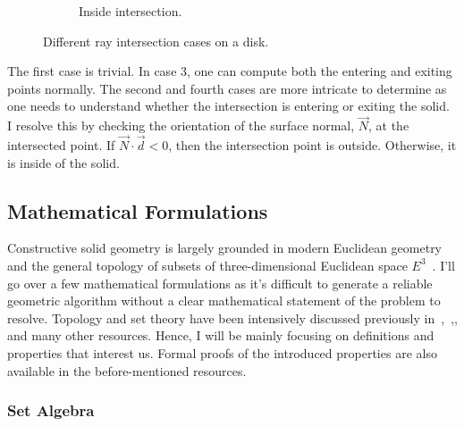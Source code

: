 \documentclass[a4paper,11pt,oneside]{article}
\begin{document}
\begin{figure}[ht]
\begin{subfigure}[b]{0.4\textwidth}
		\caption{Inside intersection.}
		\label{sec3.1:inside-intersection}
	\end{subfigure}
	\caption{Different ray intersection cases on a disk.}
	\label{sec3.1:intersection-cases}
\end{figure}


The first case is trivial. In case 3, one can compute both the entering and exiting points normally. The second and fourth cases are more intricate to determine as one needs to understand whether the intersection is entering or exiting the solid. I resolve this by checking the orientation of the surface normal, $\vec{N}$, at the intersected point. If $\vec{N}\cdot\vec{d} < 0$, then the intersection point is outside. Otherwise, it is inside of the solid.


\subsection{Mathematical Formulations}
  
Constructive solid geometry is largely grounded in modern Euclidean geometry and the general topology of subsets of three-dimensional Euclidean space $E^3$~\cite{Requicha1978MathematicalFO}. I'll go over a few mathematical formulations as it's difficult to generate a reliable geometric algorithm without a clear mathematical statement of the problem to resolve. Topology and set theory have been intensively discussed previously in~\cite{Requicha1978MathematicalFO},~\cite{tilove1977a},\cite{lachlan_srebrny_zarach_1977}, and many other resources. Hence, I will be mainly focusing on definitions and properties that interest us. Formal proofs of the introduced properties are also available in the before-mentioned resources.
  
\subsubsection{Set Algebra}
  
\theoremstyle{definition}
\newtheorem{definition}{Definition}[section]
  
\theoremstyle{property}
\newtheorem{property}{Property}[section]
    
\theoremstyle{remark}
\newtheorem*{remark}{Remark}
      
\end{document}
